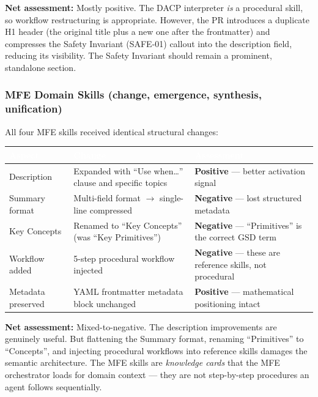 \documentclass[11pt,letterpaper]{article}
\newcommand{\tableheader}[1]{\textbf{\sffamily\textcolor{white}{#1}}}
\begin{document}
\textbf{Net assessment:} Mostly positive. The DACP interpreter \emph{is} a procedural skill, so workflow restructuring is appropriate. However, the PR introduces a duplicate H1 header (the original title plus a new one after the frontmatter) and compresses the Safety Invariant (SAFE-01) callout into the description field, reducing its visibility. The Safety Invariant should remain a prominent, standalone section.

\subsubsection{MFE Domain Skills (change, emergence, synthesis, unification)}

All four MFE skills received identical structural changes:

\begin{center}
\begin{tabularx}{\textwidth}{L{3cm}XX}
\toprule
{}
\tableheader{Aspect} & \tableheader{Change} & \tableheader{Assessment} \\
\midrule
Description & Expanded with ``Use when\ldots'' clause and specific topics & \textbf{Positive} --- better activation signal \\
Summary format & Multi-field format $\rightarrow$ single-line compressed & \textbf{Negative} --- lost structured metadata \\
Key Concepts & Renamed to ``Key Concepts'' (was ``Key Primitives'') & \textbf{Negative} --- ``Primitives'' is the correct GSD term \\
Workflow added & 5-step procedural workflow injected & \textbf{Negative} --- these are reference skills, not procedural \\
Metadata preserved & YAML frontmatter metadata block unchanged & \textbf{Positive} --- mathematical positioning intact \\
\bottomrule
\end{tabularx}
\end{center}

\textbf{Net assessment:} Mixed-to-negative. The description improvements are genuinely useful. But flattening the Summary format, renaming ``Primitives'' to ``Concepts'', and injecting procedural workflows into reference skills damages the semantic architecture. The MFE skills are \emph{knowledge cards} that the MFE orchestrator loads for domain context --- they are not step-by-step procedures an agent follows sequentially.
\end{document}
